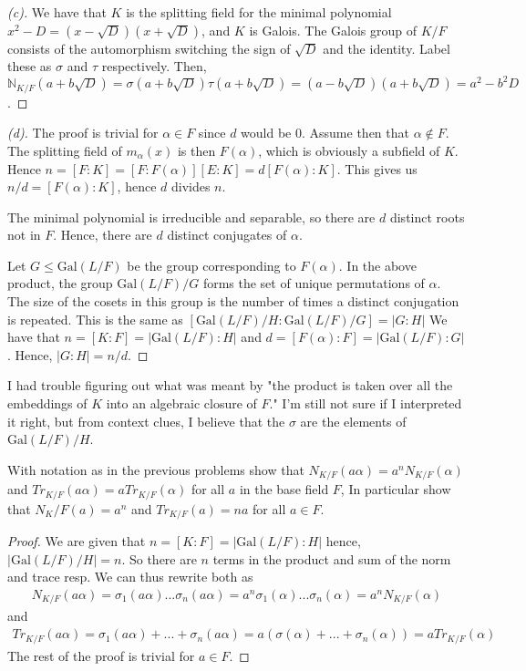 \documentclass[10pt]{article}
\newcommand{\N}{\mathbb{N}}
\newcommand{\Gal}{\text{Gal}}
\newenvironment{problem}[2][Problem]{\begin{trivlist}
		\item[\hskip \labelsep {\bfseries #1}\hskip \labelsep {\bfseries #2.}]}{\end{trivlist}}
\begin{document}
\begin{problem}{2.17}
		\begin{proof}[(c)]
			We have that $K$ is the splitting field for the minimal polynomial $x^2 - D = (x-\sqrt{D})(x+\sqrt{D})$, and $K$ is Galois. The Galois group of $K/F$ consists of the automorphism switching the sign of $\sqrt{D}$ and the identity. Label these as $\sigma$ and $\tau$ respectively. Then, $\N_{K/F}(a+b\sqrt{D}) = \sigma(a+b\sqrt{D})\tau(a+b\sqrt{D}) = (a-b\sqrt{D})(a+b\sqrt{D}) = a^2 - b^2D$.
		\end{proof}
		\begin{proof}[(d)]
			The proof is trivial for $\alpha \in F$ since $d$ would be $0$. Assume then that $\alpha \not \in F$. The splitting field of $m_\alpha(x)$ is then $F(\alpha)$, which is obviously a subfield of $K$. Hence $n = [F:K] = [F:F(\alpha)][E:K] = d[F(\alpha):K]$. This gives us $n/d = [F(\alpha):K]$, hence $d$ divides $n$.
			
			The minimal polynomial is irreducible and separable, so there are $d$ distinct roots not in $F$. Hence, there are $d$ distinct conjugates of $\alpha$.
			
			Let $G \leq \Gal(L/F)$ be the group corresponding to $F(\alpha)$. In the above product, the group $\Gal(L/F)/G$ forms the set of unique permutations of $\alpha$. The size of the cosets in this group is the number of times a distinct conjugation is repeated. This is the same as $[\Gal(L/F)/H:\Gal(L/F)/G] = |G:H|$ We have that $n = [K:F] = |\Gal(L/F):H|$ and $d = [F(\alpha):F] = |\Gal(L/F):G|$. Hence, $|G:H| = n/d$.
			
		\end{proof}
		
		\rem
			I had trouble figuring out what was meant by "the product is taken over all the embeddings of $K$ into an algebraic closure of $F$." I'm still not sure if I interpreted it right, but from context clues, I believe that the $\sigma$ are the elements of $\Gal(L/F)/H$.
	\end{problem}
	
	\begin{problem}{2.19}
		With notation as in the previous problems show that $N_{K/F}(a\alpha) = a^nN_{K/F} (\alpha)$ and $Tr_{K/F}(a\alpha) = aTr_{K/F}(\alpha)$ for all $a$ in the base field $F$, In particular show that $N_K/F(a) = a^n$ and $Tr_{K/F}(a) = na$ for all $a \in F$.
		\begin{proof}
			We are given that $n = [K:F] = |\Gal(L/F):H|$ hence, $|\Gal(L/F)/H| = n$. So there are $n$ terms in the product and sum of the norm and trace resp. We can thus rewrite both as
			\begin{align*}
				N_{K/F}(a\alpha) = \sigma_1(a\alpha)...\sigma_n(a\alpha) = a^n\sigma_1(\alpha)...\sigma_n(\alpha) = a^nN_{K/F}(\alpha)
			\end{align*}
			and
			\begin{align*}
				Tr_{K/F}(a\alpha) = \sigma_1(a\alpha) + ... + \sigma_n(a\alpha) = a(\sigma(\alpha) + ... + \sigma_n(\alpha)) = aTr_{K/F}(\alpha)
			\end{align*}
			The rest of the proof is trivial for $a \in F$.
		\end{proof}
	\end{problem}
	
\end{document}
